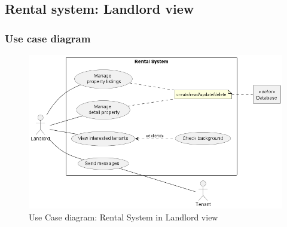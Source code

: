 \newpage
\subsection{Rental system: Landlord view}
\subsubsection{Use case diagram}
\begin{figure}[H]
    \centering
    \includegraphics[width = \textwidth]{Images/rental_systen_landlord.png}
    \caption{Use Case diagram: Rental System in Landlord view}
    \label{fig:enter-label}
\end{figure}

\newpage
